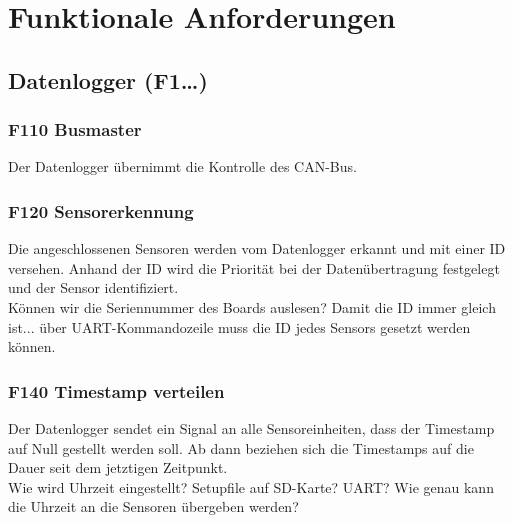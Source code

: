 %
%

\thispagestyle{empty}
\chapter{Funktionale Anforderungen}\label{chap.funktionale}
\section{Datenlogger (F1\ldots)}
\subsection{F110 Busmaster}
Der Datenlogger übernimmt die Kontrolle des CAN-Bus. 

\subsection{F120 Sensorerkennung}
Die angeschlossenen Sensoren werden vom Datenlogger erkannt und mit einer ID versehen. Anhand der ID wird die Priorität bei der Datenübertragung festgelegt und der Sensor identifiziert.\\
Können wir die Seriennummer des Boards auslesen? Damit die ID immer gleich ist... über UART-Kommandozeile muss die ID jedes Sensors gesetzt werden können.

\subsection{F140 Timestamp verteilen}
Der Datenlogger sendet ein Signal an alle Sensoreinheiten, dass der Timestamp auf Null gestellt werden soll. Ab dann beziehen sich die Timestamps auf die Dauer seit dem jetztigen Zeitpunkt.\\
Wie wird Uhrzeit eingestellt? Setupfile auf SD-Karte? UART? Wie genau kann die Uhrzeit an die Sensoren übergeben werden?

